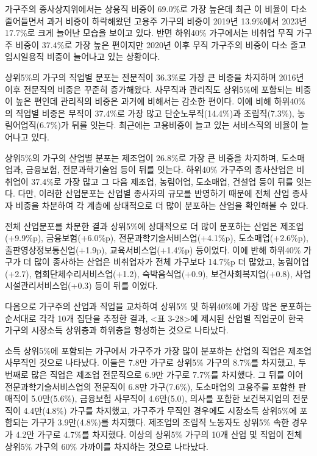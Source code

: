\documentclass[
  letterpaper,
  DIV=11,
  numbers=noendperiod]{scrartcl}
\begin{document}
가구주의 종사상지위에서는 상용직 비중이 69.0\%로 가장 높은데 최근 이
비율이 다소 줄어들면서 과거 비중이 하락해왔던 고용주 가구의 비중이
2019년 13.9\%에서 2023년 17.7\%로 크게 늘어난 모습을 보이고 있다. 반면
하위40\% 가구에서는 비취업 무직 가구주 비중이 37.4\%로 가장 높은
편이지만 2020년 이후 무직 가구주의 비중이 다소 줄고 임시일용직 비중이
늘어나고 있는 상황이다.

상위5\%의 가구의 직업별 분포는 전문직이 36.3\%로 가장 큰 비중을 차지하며
2016년 이후 전문직의 비중은 꾸준히 증가해왔다. 사무직과 관리직도
상위5\%에 포함되는 비중이 높은 편인데 관리직의 비중은 과거에 비해서는
감소한 편이다. 이에 비해 하위40\%의 직업별 비중은 무직이 37.4\%로 가장
많고 단순노무직(14.4\%)과 조립직(7.3\%), 농림어업직(6.7\%)가 뒤를
잇는다. 최근에는 고용비중이 늘고 있는 서비스직의 비율이 늘어나고 있다.

상위5\%의 가구의 산업별 분포는 제조업이 26.8\%로 가장 큰 비중을
차지하며, 도소매업과, 금융보험, 전문과학기술업 등이 뒤를 잇는다.
하위40\% 가구주의 종사산업은 비취업이 37.4\%로 가장 많고 그 다음 제조업,
농림어업, 도소매업, 건설업 등이 뒤를 잇는다. 다만, 이러한 산업분포는
산업별 종사자의 규모를 반영하기 때문에 전체 산업 종사자 비중을 차분하여
각 계층에 상대적으로 더 많이 분포하는 산업을 확인해볼 수 있다.

전체 산업분포를 차분한 결과 상위5\%에 상대적으로 더 많이 분포하는 산업은
제조업(+9.9\%p), 금융보험(+6.0\%p), 전문과학기술서비스업(+4.1\%p),
도소매업(+2.6\%p), 출판영상정보통신업(+1.9p), 교육서비스업(+1.4\%p)
등이었다. 이에 반해 하위40\% 가구가 더 많이 종사하는 산업은 비취업자가
전체 가구보다 14.7\%p 더 많았고, 농림어업(+2.7),
협회단체수리서비스업(+1.2), 숙박음식업(+0.9), 보건사회복지업(+0.8),
사업시설관리서비스업(+0.3) 등이 뒤를 이었다.

다음으로 가구주의 산업과 직업을 교차하여 상위5\% 및 하위40\%에 가장 많은
분포하는 순서대로 각각 10개 집단을 추정한 결과, \textless 표
3-28\textgreater 에 제시된 산업별 직업군이 한국 가구의 시장소득 상위층과
하위층을 형성하는 것으로 나타났다.

소득 상위5\%에 포함되는 가구에서 가구주가 가장 많이 분포하는 산업의
직업은 제조업 사무직인 것으로 나타났다. 이들은 7.8만 가구로 상위5\%
가구의 8.7\%를 차지했고, 두 번째로 많은 직업은 제조업 전문직으로 6.9만
가구로 7.7\%를 차지했다. 그 뒤를 이어 전문과학기술서비스업의 전문직이
6.8만 가구(7.6\%), 도소매업의 고용주를 포함한 판매직이 5.0만(5.6\%),
금융보험 사무직이 4.6만(5.0), 의사를 포함한 보건복지업의 전문직이
4.4만(4.8\%) 가구를 차지했고, 가구주가 무직인 경우에도 시장소득
상위5\%에 포함되는 가구가 3.9만(4.8\%)를 차지했다. 제조업의 조립직
노동자도 상위5\% 속한 경우가 4.2만 가구로 4.7\%를 차지했다. 이상의
상위5\% 가구의 10개 산업 및 직업이 전체 상위5\% 가구의 60\% 가까이를
차지하는 것으로 나타났다.
\end{document}
